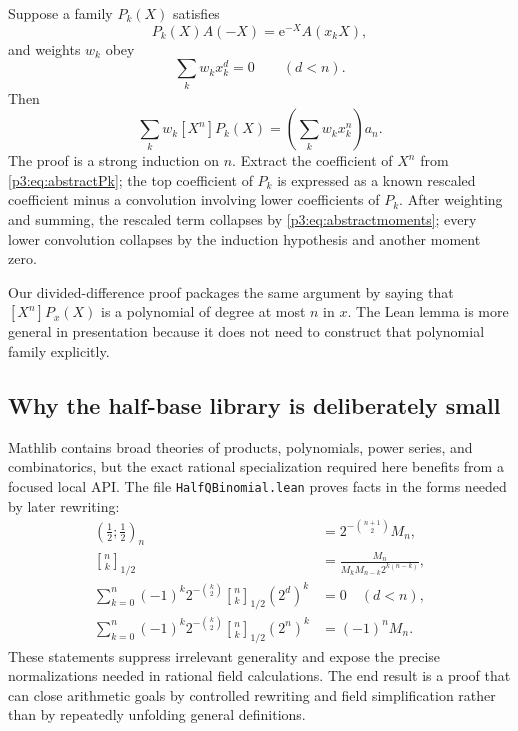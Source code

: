 \documentclass[11pt,oneside]{article}
\theoremstyle{definition}
\theoremstyle{remark}
\newcommand{\qpoch}[3]{\left(#1;#2\right)_{#3}}
\newcommand{\halfqbinom}[2]{{\genfrac{[}{]}{0pt}{}{#1}{#2}}_{1/2}}
\newcommand{\coeff}[2]{\left[#1^{#2}\right]}
\newcommand{\e}{\mathrm e}
\begin{document}
Suppose a family $P_k(X)$ satisfies
\begin{equation}\label{p3:eq:abstractPk}
 P_k(X)A(-X)=\e^{-X}A(x_kX),
\end{equation}
and weights $w_k$ obey
\begin{equation}\label{p3:eq:abstractmoments}
 \sum_kw_kx_k^d=0\qquad(d<n).
\end{equation}
Then
\begin{equation}\label{p3:eq:abstractisolation}
 \sum_kw_k\coeff{X}{n}P_k(X)
 =\left(\sum_kw_kx_k^n\right)a_n.
\end{equation}
The proof is a strong induction on $n$.  Extract the coefficient of $X^n$
from \eqref{p3:eq:abstractPk}; the top coefficient of $P_k$ is expressed as a
known rescaled coefficient minus a convolution involving lower coefficients
of $P_k$.  After weighting and summing, the rescaled term collapses by
\eqref{p3:eq:abstractmoments}; every lower convolution collapses by the
induction hypothesis and another moment zero.

Our divided-difference proof packages the same argument by saying that
$\coeff{X}{n}P_x(X)$ is a polynomial of degree at most $n$ in $x$.  The Lean
lemma is more general in presentation because it does not need to construct
that polynomial family explicitly.

\subsection{Why the half-base library is deliberately small}

Mathlib contains broad theories of products, polynomials, power series, and
combinatorics, but the exact rational specialization required here benefits
from a focused local API.  The file \texttt{HalfQBinomial.lean} proves facts
in the forms needed by later rewriting:
\begin{align*}
 \qpoch{\tfrac12}{\tfrac12}{n}
 &=2^{-\binom{n+1}{2}}M_n,\\
 \halfqbinom{n}{k}
 &=\frac{M_n}{M_kM_{n-k}2^{k(n-k)}},\\
 \sum_{k=0}^{n}(-1)^k2^{-\binom{k}{2}}
 \halfqbinom{n}{k}(2^d)^k&=0\quad(d<n),\\
 \sum_{k=0}^{n}(-1)^k2^{-\binom{k}{2}}
 \halfqbinom{n}{k}(2^n)^k&=(-1)^nM_n.
\end{align*}
These statements suppress irrelevant generality and expose the precise
normalizations needed in rational field calculations.  The end result is a
proof that can close arithmetic goals by controlled rewriting and field
simplification rather than by repeatedly unfolding general definitions.
\end{document}
